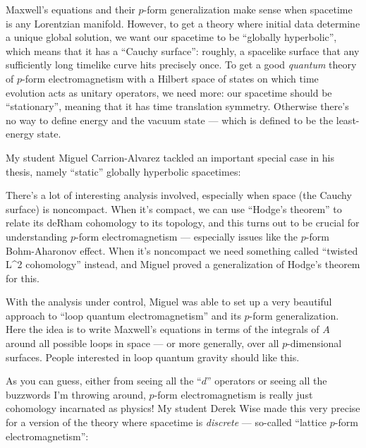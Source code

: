 \documentclass{article}
\def\tightlist{}
\renewcommand{\texttt}[1]{%
  \begingroup
  \ttfamily
  \begingroup\lccode`~=`/\lowercase{\endgroup\def~}{/\discretionary{}{}{}}%
  \begingroup\lccode`~=`[\lowercase{\endgroup\def~}{[\discretionary{}{}{}}%
  \begingroup\lccode`~=`.\lowercase{\endgroup\def~}{.\discretionary{}{}{}}%
  \catcode`/=\active\catcode`[=\active\catcode`.=\active
  \scantokens{#1\noexpand}%
  \endgroup
}
\begin{document}
Maxwell's equations and their \(p\)-form generalization make sense when
spacetime is any Lorentzian manifold. However, to get a theory where
initial data determine a unique global solution, we want our spacetime
to be ``globally hyperbolic'', which means that it has a ``Cauchy
surface'': roughly, a spacelike surface that any sufficiently long
timelike curve hits precisely once. To get a good \emph{quantum} theory
of \(p\)-form electromagnetism with a Hilbert space of states on which
time evolution acts as unitary operators, we need more: our spacetime
should be ``stationary'', meaning that it has time translation symmetry.
Otherwise there's no way to define energy and the vacuum state --- which
is defined to be the least-energy state.

My student Miguel Carrion-Alvarez tackled an important special case in
his thesis, namely ``static'' globally hyperbolic spacetimes:


There's a lot of interesting analysis involved, especially when space
(the Cauchy surface) is noncompact. When it's compact, we can use
``Hodge's theorem'' to relate its deRham cohomology to its topology, and
this turns out to be crucial for understanding \(p\)-form
electromagnetism --- especially issues like the \(p\)-form Bohm-Aharonov
effect. When it's noncompact we need something called ``twisted L\^{}2
cohomology'' instead, and Miguel proved a generalization of Hodge's
theorem for this.

With the analysis under control, Miguel was able to set up a very
beautiful approach to ``loop quantum electromagnetism'' and its
\(p\)-form generalization. Here the idea is to write Maxwell's equations
in terms of the integrals of \(A\) around all possible loops in space
--- or more generally, over all \(p\)-dimensional surfaces. People
interested in loop quantum gravity should like this.

As you can guess, either from seeing all the ``\(d\)'' operators or
seeing all the buzzwords I'm throwing around, \(p\)-form
electromagnetism is really just cohomology incarnated as physics! My
student Derek Wise made this very precise for a version of the theory
where spacetime is \emph{discrete} --- so-called ``lattice \(p\)-form
electromagnetism'':
\end{document}
